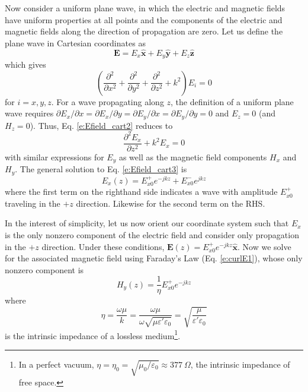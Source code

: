 \documentclass[11pt, oneside]{article}
\begin{document}
Now consider a uniform plane wave, in which the electric and magnetic fields have uniform properties at all points and the components of the electric and magnetic fields along the direction of propagation are zero. Let us define the plane wave in Cartesian coordinates as
	\begin{equation}
	\label{e:Efield_cart1} 
	\mathbf{E} = E_x\hat{\mathbf{x}} + E_y\hat{\mathbf{y}} + E_z\hat{\mathbf{z}}  
	\end{equation}
which gives
	\begin{equation}
	\label{e:Efield_cart2}
	\left(\frac{\partial^2}{\partial x^2} + \frac{\partial^2}{\partial y^2} + \frac{\partial^2}{\partial z^2} + k^2\right)E_i = 0
	\end{equation}
for $i = x,y,z$. For a wave propagating along $z$, the definition of a uniform plane wave requires $\partial E_x/\partial x = \partial E_x/\partial y = \partial E_y/\partial x = \partial E_y/\partial y = 0$ and $E_z = 0$ (and $H_z = 0$). Thus, Eq. \ref{e:Efield_cart2} reduces to
	\begin{equation}
	\label{e:Efield_cart3}
	\frac{\partial^2 E_x}{\partial z^2} + k^2E_x = 0 
	\end{equation}
with similar expressions for $E_y$ as well as the magnetic field components $H_x$ and $H_y$. The general solution to Eq. \ref{e:Efield_cart3} is
	\begin{equation}
	E_x(z) = E_{x0}^+e^{-jkz} + E_{x0}^-e^{jkz} 
	\end{equation}
where the first term on the righthand side indicates a wave with amplitude $E_{x0}^+$ traveling in the $+z$ direction. Likewise for the second term on the RHS. 

In the interest of simplicity, let us now orient our coordinate system such that $E_x$ is the only nonzero component of the electric field and consider only propagation in the $+z$ direction. Under these conditions, $\mathbf{E}(z) = E_{x0}^+e^{-jkz}\hat{\mathbf{x}}$. Now we solve for the associated magnetic field using Faraday's Law (Eq. \ref{e:curlE1}), whose only nonzero component is
	\begin{equation}
	H_y(z) = \frac{1}{\eta}E_{x0}^+e^{-jkz}
	\end{equation}
where
	\begin{equation}
	\eta = \frac{\omega\mu}{k} = \frac{\omega\mu}{\omega\sqrt{\mu\varepsilon'\varepsilon_0}} = \sqrt{\frac{\mu}{\varepsilon'\varepsilon_0}}
	\end{equation}
is the intrinsic impedance of a lossless medium\footnote{In a perfect vacuum, $\eta = \eta_0 = \sqrt{\mu_0/\varepsilon_0} \approx 377\ \Omega$, the intrinsic impedance of free space.}. 
\end{document}
